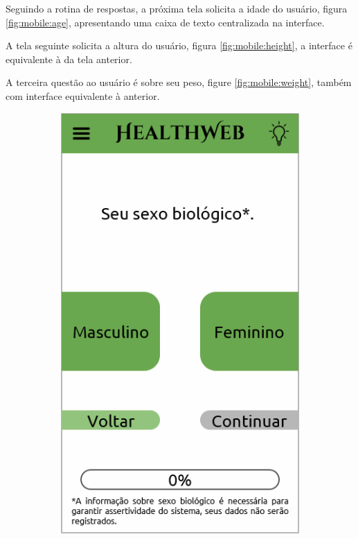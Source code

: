 Seguindo a rotina de respostas, a próxima tela solicita a idade do usuário, figura \ref{fig:mobile:age}, apresentando uma caixa de texto centralizada na interface.

A tela seguinte solicita a altura do usuário, figura \ref{fig:mobile:height}, a interface é equivalente à da tela anterior.

A terceira questão ao usuário é sobre seu peso, figure \ref{fig:mobile:weight}, também com interface equivalente à anterior.

\begin{figure}[htbp]
	\centering
	\begin{subfigure}{0.24\linewidth}
		\centering
		\includegraphics[width=\linewidth]{figure/prototype/mobile/bio_sex.png}

\end{subfigure}
\end{figure}
